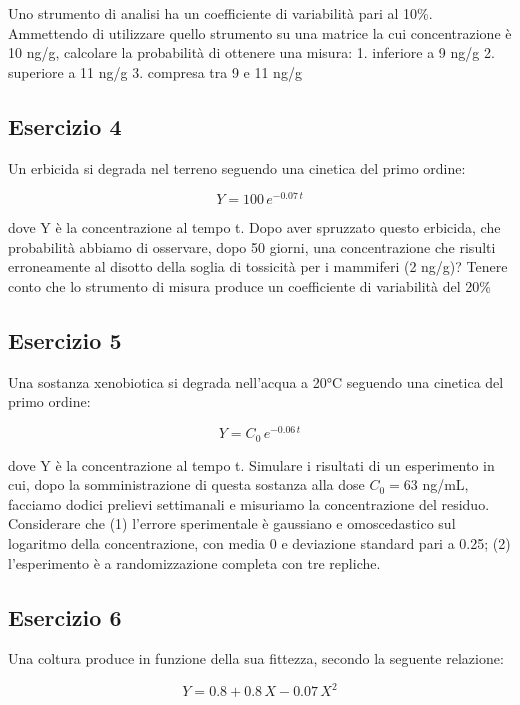 \documentclass[a4paper,12pt,oneside]{book}
\begin{document}
Uno strumento di analisi ha un coefficiente di variabilità pari al 10\%. Ammettendo di utilizzare quello strumento su una matrice la cui concentrazione è 10 ng/g, calcolare la probabilità di ottenere una misura:
1. inferiore a 9 ng/g
2. superiore a 11 ng/g
3. compresa tra 9 e 11 ng/g

\hypertarget{esercizio-4-2}{%
\subsection{Esercizio 4}\label{esercizio-4-2}}

Un erbicida si degrada nel terreno seguendo una cinetica del primo ordine:

\[Y = 100 \, e^{-0.07 \, t}\]

dove Y è la concentrazione al tempo t. Dopo aver spruzzato questo erbicida, che probabilità abbiamo di osservare, dopo 50 giorni, una concentrazione che risulti erroneamente al disotto della soglia di tossicità per i mammiferi (2 ng/g)? Tenere conto che lo strumento di misura produce un coefficiente di variabilità del 20\%

\hypertarget{esercizio-5-2}{%
\subsection{Esercizio 5}\label{esercizio-5-2}}

Una sostanza xenobiotica si degrada nell'acqua a 20°C seguendo una cinetica del primo ordine:

\[Y = C_0 \, e^{-0.06 \, t}\]

dove Y è la concentrazione al tempo t. Simulare i risultati di un esperimento in cui, dopo la somministrazione di questa sostanza alla dose \(C_0 = 63\) ng/mL, facciamo dodici prelievi settimanali e misuriamo la concentrazione del residuo. Considerare che (1) l'errore sperimentale è gaussiano e omoscedastico sul logaritmo della concentrazione, con media 0 e deviazione standard pari a 0.25; (2) l'esperimento è a randomizzazione completa con tre repliche.

\hypertarget{esercizio-6}{%
\subsection{Esercizio 6}\label{esercizio-6}}

Una coltura produce in funzione della sua fittezza, secondo la seguente relazione:

\[ Y = 0.8 + 0.8 \, X - 0.07 \, X^2\]
\end{document}
